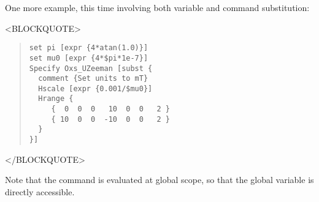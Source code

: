 One more example, this time involving both variable and command
substitution:
\begin{rawhtml}
<BLOCKQUOTE>
\end{rawhtml}
\begin{quote}
\begin{verbatim}
set pi [expr {4*atan(1.0)}]
set mu0 [expr {4*$pi*1e-7}]
Specify Oxs_UZeeman [subst {
  comment {Set units to mT}
  Hscale [expr {0.001/$mu0}]
  Hrange {
     {  0  0  0   10  0  0   2 }
     { 10  0  0  -10  0  0   2 }
  }
}]
\end{verbatim}
\end{quote}
\begin{rawhtml}
</BLOCKQUOTE>
\end{rawhtml}
Note that the  command is evaluated at global scope, so that
the global variable  is directly accessible.

